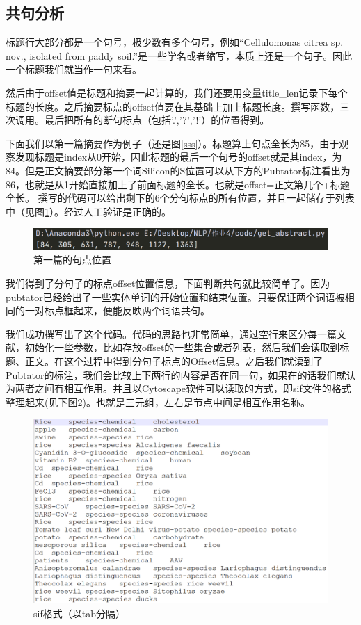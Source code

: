 \documentclass[12pt]{article}
\begin{document}
\subsection{共句分析}
标题行大部分都是一个句号，极少数有多个句号，例如“Cellulomonas citrea sp. nov., isolated from paddy soil.”是一些学名或者缩写，本质上还是一个句子。因此一个标题我们就当作一句来看。\par
然后由于offset值是标题和摘要一起计算的，我们还要用变量title\_len记录下每个标题的长度。之后摘要标点的offset值要在其基础上加上标题长度。撰写函数，三次调用。最后把所有的断句标点（包括'.','?','!'）的位置得到。\par
下面我们以第一篇摘要作为例子（还是图\ref{sss}）。标题算上句点全长为85，由于观察发现标题是index从0开始，因此标题的最后一个句号的offset就是其index，为84。但是正文摘要部分第一个词Silicon的S位置可以从下方的Pubtator标注看出为86，也就是从1开始直接加上了前面标题的全长。也就是offset=正文第几个+标题全长。
撰写的代码可以给出剩下的6个分句标点的所有位置，并且一起储存于列表中（见图\ref{hhhh}）。经过人工验证是正确的。
\begin{figure}[H]
  \centering
  \includegraphics[scale=0.5]{./picture/list.png} %
  \caption{第一篇的句点位置} %
  \label{hhhh} %
\end{figure}	
我们得到了分句子的标点offset位置信息，下面判断共句就比较简单了。因为pubtator已经给出了一些实体单词的开始位置和结束位置。只要保证两个词语被相同的一对标点框起来，便能反映两个词语共句。\par
我们成功撰写出了这个代码。代码的思路也非常简单，通过空行来区分每一篇文献，初始化一些参数，比如存放offset的一些集合或者列表，然后我们会读取到标题、正文。在这个过程中得到分句子标点的Offset信息。之后我们就读到了Pubtator的标注，我们会比较上下两行的内容是否在同一句，如果在的话我们就认为两者之间有相互作用。并且以Cytoscape软件可以读取的方式，即sif文件的格式整理起来(见下图\ref{ssaaass})。也就是三元组，左右是节点中间是相互作用名称。\par
\begin{figure}[H]
  \centering
  \includegraphics[scale=0.4]{./picture/form.png} %
  \caption{sif格式（以tab分隔）} %
  \label{ssaaass} %
\end{figure}
\end{document}
